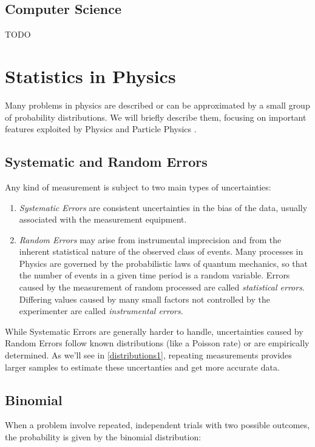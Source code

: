 \subsection{Computer Science}
TODO

\section{Statistics in Physics}

Many problems in physics are described or can be approximated by a small group of probability distributions. We will briefly describe them, focusing on important features exploited by Physics and Particle Physics \cite{leo2012techniques}.

\subsection{Systematic and Random Errors}

Any kind of measurement is subject to two main types of uncertainties:

\begin{enumerate}
	\item \textit{Systematic Errors} are consistent uncertainties in the bias of the data, usually associated with the measurement equipment.
	\item \textit{Random Errors} may arise from instrumental imprecision and from the inherent statistical nature of the observed class of events. Many processes in Physics are governed by the probabilistic laws of quantum mechanics, so that the number of events in a given time period is a random variable. Errors caused by the measurement of random processed are called \textit{statistical errors}. Differing values caused by many small factors not controlled by the experimenter are called \textit{instrumental errors}.
\end{enumerate}

While Systematic Errors are generally harder to handle, uncertainties caused by Random Errors follow known distributions (like a Poisson rate) or are empirically determined. As we'll see in \ref{distributions1}, repeating measurements provides larger samples to estimate these uncertanties and get more accurate data.


\subsection{Binomial}

When a problem involve repeated, independent trials with two possible outcomes, the probability is given by the binomial distribution:

